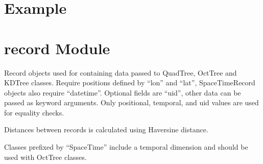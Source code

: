 \documentclass[letterpaper,10pt,english]{sphinxmanual}
\begin{document}
\section{Example}
\label{\detokenize{record:example}}
\begin{sphinxVerbatim}[commandchars=\\\{\}]
 

     
     
\end{sphinxVerbatim}


\section{record Module}
\label{\detokenize{record:module-GeoSpatialTools.record}}\label{\detokenize{record:record-module}}
\sphinxAtStartPar
Record objects used for containing data passed to QuadTree, OctTree and KDTree
classes. Require positions defined by “lon” and “lat”, SpaceTimeRecord objects
also require “datetime”. Optional fields are “uid”, other data can be passed as
keyword arguments. Only positional, temporal, and uid values are used for
equality checks.

\sphinxAtStartPar
Distances between records is calculated using Haversine distance.

\sphinxAtStartPar
Classes prefixed by “SpaceTime” include a temporal dimension and should be used
with OctTree classes.
\end{document}
